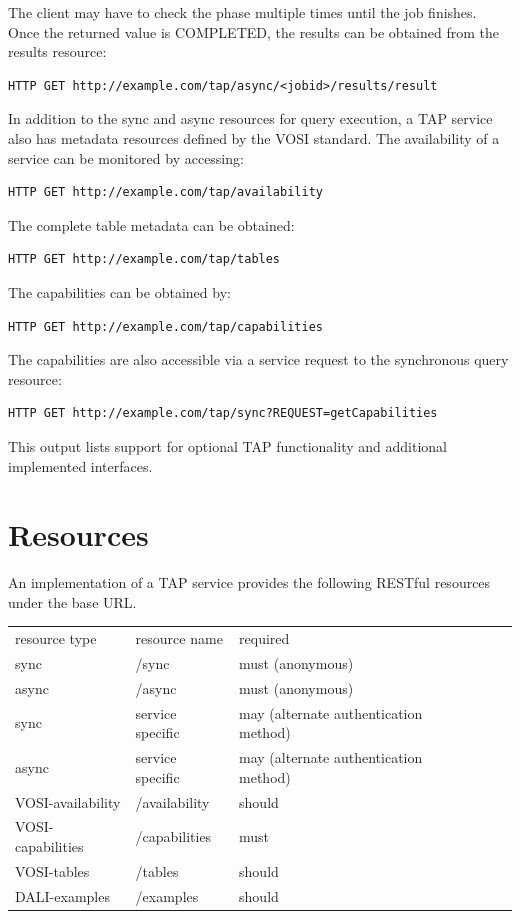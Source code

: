 \documentclass[11pt,a4paper]{ivoa}
\begin{document}
The client may have to check the phase multiple times until the job 
finishes. Once the returned value is COMPLETED, the results can be obtained 
from the results resource:

\begin{verbatim}
HTTP GET http://example.com/tap/async/<jobid>/results/result
\end{verbatim}

In addition to the sync and async resources for query execution, a TAP service 
also has metadata resources defined by the VOSI standard. The availability of a 
service can be monitored by accessing:

\begin{verbatim}
HTTP GET http://example.com/tap/availability
\end{verbatim}

The complete table metadata can be obtained:

\begin{verbatim}
HTTP GET http://example.com/tap/tables
\end{verbatim}

The capabilities can be obtained by:

\begin{verbatim}
HTTP GET http://example.com/tap/capabilities
\end{verbatim}

The capabilities are also accessible via a service request to the synchronous 
query resource:

\begin{verbatim}
HTTP GET http://example.com/tap/sync?REQUEST=getCapabilities
\end{verbatim}

This output lists support for optional TAP functionality and additional 
implemented interfaces.

\section{Resources}

An implementation of a TAP service provides the following RESTful resources 
under the base URL.

\begin{tabular}{l l l l l}
resource type & resource name & required \\
{sync} & /sync & must (anonymous) & \\
{async} & /async & must (anonymous) & \\
{sync} & service specific & may (alternate authentication method) & \\
{async} & service specific & may (alternate authentication method) & \\
VOSI-availability & /availability & should & \\
VOSI-capabilities & /capabilities & must & \\
VOSI-tables & /tables & should & \\
DALI-examples & /examples & should & \\
\end{tabular}
\end{document}
